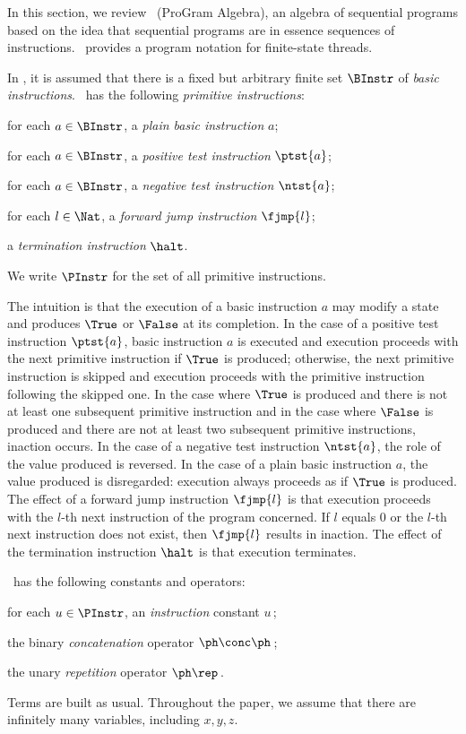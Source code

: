 \documentclass[fleqn]{llncs}
\begin{document}
In this section, we review \PGA\ (ProGram Algebra), an algebra of
sequential programs based on the idea that sequential programs are in
essence sequences of instructions.
\PGA\ provides a program notation for finite-state threads.

In \PGA, it is assumed that there is a fixed but arbitrary finite set
$\BInstr$ of \emph{basic instructions}.
\PGA\ has the following \emph{primitive instructions}:
\begin{iteml}
\item
for each $a \in \BInstr$, a \emph{plain basic instruction} $a$;
\item
for each $a \in \BInstr$, a \emph{positive test instruction} $\ptst{a}$;
\item
for each $a \in \BInstr$, a \emph{negative test instruction} $\ntst{a}$;
\item
for each $l \in \Nat$, a \emph{forward jump instruction} $\fjmp{l}$;
\item
a \emph{termination instruction} $\halt$.
\end{iteml}
We write $\PInstr$ for the set of all primitive instructions.

The intuition is that the execution of a basic instruction $a$ may
modify a state and produces $\True$ or $\False$ at its completion.
In the case of a positive test instruction $\ptst{a}$, basic instruction
$a$ is executed and execution proceeds with the next primitive
instruction if $\True$ is produced; otherwise, the next primitive
instruction is skipped and execution proceeds with the primitive
instruction following the skipped one.
In the case where $\True$ is produced and there is not at least one
subsequent primitive instruction and in the case where $\False$ is
produced and there are not at least two subsequent primitive
instructions, inaction occurs.
In the case of a negative test instruction $\ntst{a}$, the role of the
value produced is reversed.
In the case of a plain basic instruction $a$, the value produced is
disregarded: execution always proceeds as if $\True$ is produced.
The effect of a forward jump instruction $\fjmp{l}$ is that execution
proceeds with the $l$-th next instruction of the program concerned.
If $l$ equals $0$ or the $l$-th next instruction does not exist, then
$\fjmp{l}$ results in inaction.
The effect of the termination instruction $\halt$ is that execution
terminates.

\PGA\ has the following constants and operators:
\begin{iteml}
\item
for each $u \in \PInstr$, an \emph{instruction} constant $u$\,;
\item
the binary \emph{concatenation} operator $\ph \conc \ph$\,;
\item
the unary \emph{repetition} operator $\ph\rep$\,.
\end{iteml}
Terms are built as usual.
Throughout the paper, we assume that there are infinitely many
variables, including $x,y,z$.
\end{document}
